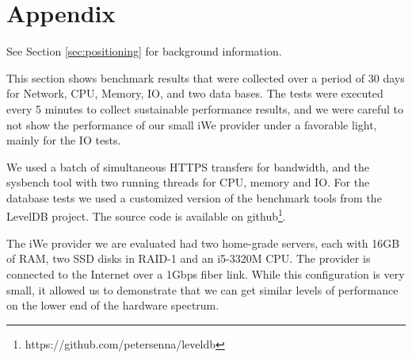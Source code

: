 \vspace{15ex} %
\chapter{Appendix}
\label{cha:appendix}

See Section \ref{sec:positioning} for background information.

This section shows benchmark results that were collected over a period of 30
days for Network, CPU, Memory, IO, and two data bases. The tests were executed
every 5 minutes to collect sustainable performance results, and we were careful
to not show the performance of our small iWe provider under a favorable light,
mainly for the IO tests.

We used a batch of simultaneous HTTPS transfers for bandwidth, and the sysbench
tool with two running threads for CPU, memory and IO. For the database tests we
used a customized version of the benchmark tools from the LevelDB project. The
source code is available on
github\footnote{https://github.com/petersenna/leveldb}.

The iWe provider we are evaluated had two home-grade servers, each with 16GB of
RAM, two SSD disks in RAID-1 and an i5-3320M CPU. The provider is connected to
the Internet over a 1Gbps fiber link. While this configuration is very small, it
allowed us to demonstrate that we can get similar levels of performance on the
lower end of the hardware spectrum.

